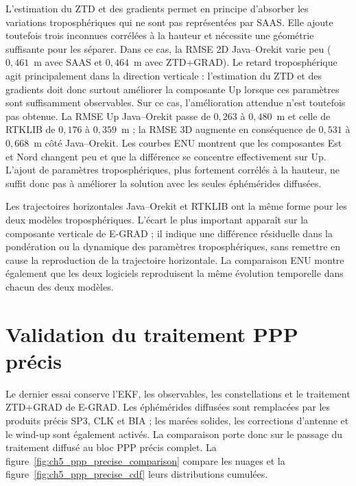 L'estimation du ZTD et des gradients permet en principe d'absorber les
variations troposphériques qui ne sont pas représentées par SAAS. Elle ajoute
toutefois trois inconnues corrélées à la hauteur et nécessite une géométrie
suffisante pour les séparer. Dans ce cas, la RMSE 2D Java--Orekit varie peu
($0{,}461$~m avec SAAS et $0{,}464$~m avec ZTD+GRAD). Le retard troposphérique
agit principalement dans la direction verticale : l'estimation du ZTD et des
gradients doit donc surtout améliorer la composante Up lorsque ces paramètres
sont suffisamment observables. Sur ce cas, l'amélioration attendue n'est
toutefois pas obtenue. La RMSE Up Java--Orekit passe de $0{,}263$ à $0{,}480$~m
et celle de RTKLIB de $0{,}176$ à $0{,}359$~m ; la RMSE 3D augmente en
conséquence de $0{,}531$ à $0{,}668$~m côté Java--Orekit. Les courbes ENU
montrent que les composantes Est et Nord changent peu et que la différence se
concentre effectivement sur Up. L'ajout de paramètres troposphériques, plus
fortement corrélés à la hauteur, ne suffit donc pas à améliorer la solution
avec les seules éphémérides diffusées.

Les trajectoires horizontales Java--Orekit et RTKLIB ont la même forme pour les
deux modèles troposphériques. L'écart le plus important apparaît sur la
composante verticale de E-GRAD ; il indique une différence résiduelle dans la
pondération ou la dynamique des paramètres troposphériques, sans remettre en
cause la reproduction de la trajectoire horizontale. La comparaison ENU
montre également que les deux logiciels reproduisent la même évolution
temporelle dans chacun des deux modèles.


\section{Validation du traitement PPP précis}
\label{sec:validation_ppp_precise}

Le dernier essai conserve l'EKF, les observables, les constellations et le
traitement ZTD+GRAD de E-GRAD. Les éphémérides diffusées sont remplacées par les
produits précis SP3, CLK et BIA ; les marées solides, les corrections d'antenne
et le wind-up sont également activés. La comparaison porte donc sur le passage
du traitement diffusé au bloc PPP précis complet. La
figure~\ref{fig:ch5_ppp_precise_comparison} compare les nuages et la
figure~\ref{fig:ch5_ppp_precise_cdf} leurs distributions cumulées.

